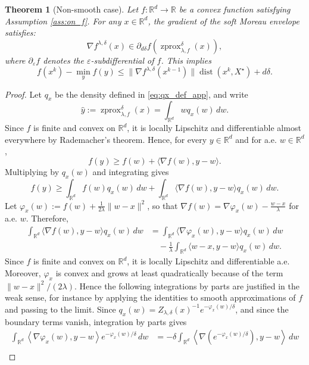 \documentclass{article}
\newtheorem{theorem}{Theorem}
\newcommand{\zprox}{\ensuremath{\operatorname{zprox}}}
\begin{document}
\begin{theorem}[Non-smooth case]
Let $f:\mathbb{R}^d\to \mathbb{R}$ be a convex function satisfying Assumption \ref{ass:on_f}. For any $x \in \mathbb{R}^d$, the gradient of the soft Moreau envelope satisfies:
$$\nabla f^{\lambda,\delta}(x) \in \partial_{d\delta} f\left(\zprox_{\lambda, f}^\delta(x)\right),$$
where $\partial_\varepsilon f$ denotes the $\varepsilon$-subdifferential of $f$. This implies
\[f(x^{k})-\min_y f(y)\leq \|\nabla f^{\lambda,\delta}(x^{k-1})\|\operatorname{dist}(x^{k},X^\star)+ d \delta.\]
\end{theorem}
\begin{proof} Let \(q_x\) be the density defined in \eqref{eq:qx_def_app}, and write \[ \hat y := \zprox_{\lambda,f}^{\delta}(x) = \int_{\mathbb{R}^d} w q_x(w)\,dw . \] Since \(f\) is finite and convex on \(\mathbb{R}^d\), it is locally Lipschitz and differentiable almost everywhere by Rademacher's theorem. Hence, for every \(y\in\mathbb{R}^d\) and for a.e. \(w\in\mathbb{R}^d\), \[ f(y)\ge f(w)+\langle \nabla f(w),y-w\rangle . \] Multiplying by \(q_x(w)\) and integrating gives \[ f(y) \ge \int_{\mathbb{R}^d} f(w)q_x(w)\,dw + \int_{\mathbb{R}^d} \langle \nabla f(w),y-w\rangle q_x(w)\,dw . \] Let  $\varphi_x(w) := f(w)+\frac{1}{2\lambda}\|w-x\|^2$, so that $\nabla f(w) = \nabla \varphi_x(w)-\frac{w-x}{\lambda}$ for a.e. \(w\). Therefore, \[ \begin{aligned} \int_{\mathbb{R}^d} \langle \nabla f(w),y-w\rangle q_x(w)\,dw &= \int_{\mathbb{R}^d} \langle \nabla \varphi_x(w),y-w\rangle q_x(w)\,dw \\ &\quad -\frac{1}{\lambda} \int_{\mathbb{R}^d} \langle w-x,y-w\rangle q_x(w)\,dw . \end{aligned} \] Since \(f\) is finite and convex on \(\mathbb{R}^d\), it is locally Lipschitz and differentiable a.e. Moreover, \(\varphi_x\) is convex and grows at least quadratically because of the term \(\|w-x\|^2/(2\lambda)\). Hence the following integrations by parts are justified in the weak sense, for instance by applying the identities to smooth approximations of \(f\) and passing to the limit. Since \(q_x(w)=Z_{\lambda,\delta}(x)^{-1}e^{-\varphi_x(w)/\delta}\), and since the
boundary terms vanish, integration by parts gives
\[\begin{aligned}
\int_{\mathbb{R}^d}
\left\langle \nabla \varphi_x(w), y-w \right\rangle
e^{-\varphi_x(w)/\delta}\,dw & =
-\delta
\int_{\mathbb{R}^d}
\left\langle
\nabla\left(e^{-\varphi_x(w)/\delta}\right),
y-w
\right\rangle\,dw \\

\end{aligned}\]
\end{proof}
\end{document}
